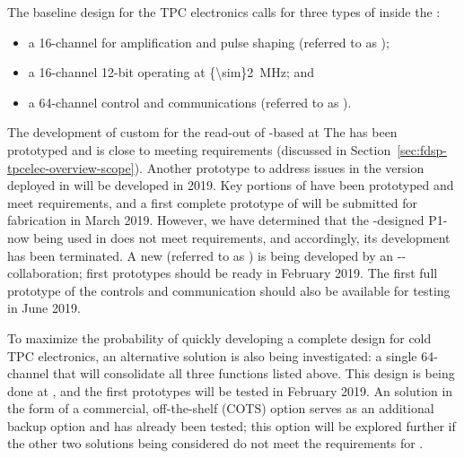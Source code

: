 The baseline design for the  TPC electronics calls for three 
types of  inside  the :
\begin{itemize}
\item{a \num{16}-channel   for amplification 
and pulse shaping (referred to as );}
\item{a \num{16}-channel \num{12}-bit   
operating at \SI{{\sim}2}{MHz}; and}
\item{a \num{64}-channel control and communications  
(referred to as ).}
\end{itemize}

The development of custom  for the read-out of -based
 at 
The   has been prototyped and is close to meeting 
requirements (discussed in Section~\ref{sec:fdsp-tpcelec-overview-scope}). 
Another prototype to address issues in the version deployed in  
will be developed in 2019. Key portions of  have been
prototyped and meet requirements, and a first complete prototype of
 will be submitted for fabrication in March 2019.
However, we have determined that the -designed P1-  
now being used in  does not meet requirements, and accordingly, 
its development has been terminated. A new   (referred 
to as ) is being developed by an -- 
collaboration; first prototypes should be ready in February 2019. The first full 
prototype of the controls and communication  should also be available for 
testing in June 2019.

To maximize the probability of quickly developing a complete design for cold TPC  electronics, an alternative solution is also being investigated: a single \num{64}-channel  that will consolidate all three functions listed above.  This design is being done at , and the first prototypes will be tested in February 2019.  An  solution in the form of a commercial, off-the-shelf (COTS) option serves as an additional backup option and has already been tested; this option will be explored further if the other two  solutions being considered do not meet the requirements for .

